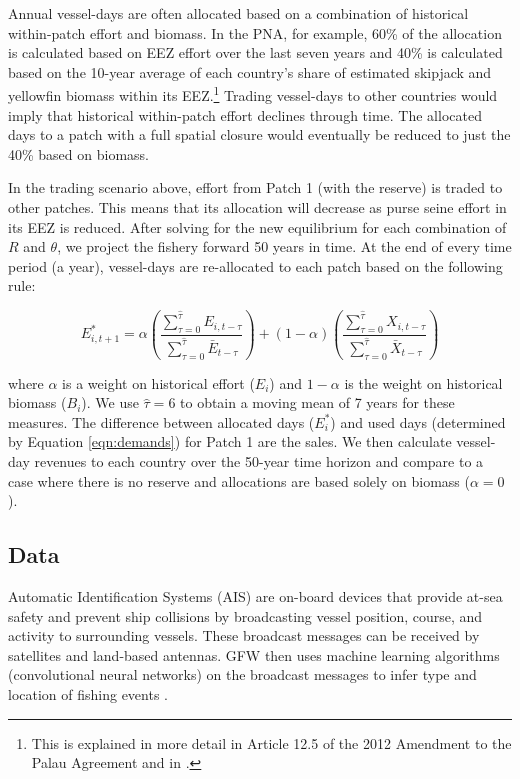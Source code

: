 \documentclass[12pt]{article}
\begin{document}
Annual vessel-days are often allocated based on a combination of historical within-patch effort and biomass. In the PNA, for example, 60\% of the allocation is calculated based on EEZ effort over the last seven years and 40\% is calculated based on the 10-year average of each country’s share of estimated skipjack and yellowfin biomass within its EEZ.\footnote{This is explained in more detail in Article 12.5 of the 2012 Amendment to the Palau Agreement and in \cite{Hagrannsoknir2014}.} Trading vessel-days to other countries would imply that historical within-patch effort declines through time. The allocated days to a patch with a full spatial closure would eventually be reduced to just the 40\% based on biomass.

In the trading scenario above, effort from Patch 1 (with the reserve) is traded to other patches. This means that its allocation will decrease as purse seine effort in its EEZ is reduced. After solving for the new equilibrium for each combination of $R$ and $\theta$, we project the fishery forward 50 years in time. At the end of every time period (a year), vessel-days are re-allocated to each patch based on the following rule:

$$
E_{i,t+1}^* = \alpha
\left(\frac{\sum_{\tau = 0}^{\hat{\tau}}E_{i,t-\tau}}{\sum_{\tau = 0}^{\hat{\tau}}\bar{E}_{{t-\tau}}}
	\right)
	+
(1 - \alpha)
\left(\frac{\sum_{\tau = 0}^{\hat{\tau}}X_{i,t-\tau}}{\sum_{\tau = 0}^{\hat{\tau}}\bar{X}_{t-\tau}} \right)
$$

\noindent where $\alpha$ is a weight on historical effort ($E_i$) and $1-\alpha$ is the weight on historical biomass ($B_i$). We use $\hat{\tau}= 6$ to obtain a moving mean of 7 years for these measures. The difference between allocated days ($E_i^*$) and used days (determined by Equation \ref{eqn:demands}) for Patch 1 are the sales. We then calculate vessel-day revenues to each country over the 50-year time horizon and compare to a case where there is no reserve and allocations are based solely on biomass ($\alpha = 0$).

\subsection{Data}

Automatic Identification Systems (AIS) are on-board devices that provide at-sea safety and prevent ship collisions by broadcasting vessel position, course, and activity to surrounding vessels. These broadcast messages can be received by satellites and land-based antennas. GFW then uses machine learning algorithms (convolutional neural networks) on the broadcast messages to infer type and location of fishing events \cite{kroodsma_2018}.
\end{document}

